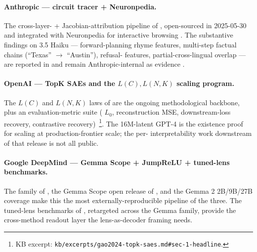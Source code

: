 \paragraph{Anthropic --- circuit tracer + Neuronpedia.}
The cross-layer- + Jacobian-attribution pipeline of
\citet{lindsey2025-circuit-tracing}, open-sourced in 2025-05-30 and
integrated with Neuronpedia for interactive  browsing
. The substantive findings on 
3.5 Haiku --- forward-planning rhyme features, multi-step factual
chains (``Texas'' $\to$ ``Austin''), refusal- features,
partial-cross-lingual  overlap --- are reported in
\citet{lindsey2025-biology} and remain Anthropic-internal as evidence
.

\paragraph{OpenAI --- TopK SAEs and the $L(C), L(N, K)$ scaling
program.}
The $L(C)$ and $L(N, K)$ laws of \citet{gao2024-topk-saes} are the
ongoing methodological backbone, plus an evaluation-metric suite (
$L_0$, reconstruction MSE, downstream-loss recovery, contrastive 
recovery)~\citep[\S 1 contributions]{gao2024-topk-saes}\footnote{KB
excerpt: \texttt{kb/excerpts/gao2024-topk-saes.md\#sec-1-headline}.}.
The 16M-latent GPT-4  is the existence proof for  scaling at
production-frontier scale; the per- interpretability work
downstream of that release is not all public.

\paragraph{Google DeepMind --- Gemma Scope + JumpReLU + tuned-lens
benchmarks.}
The  family of \citet{rajamanoharan2024-jumprelu}, the
Gemma Scope open release of \citet{gemma-scope-2024}, and the Gemma 2
2B/9B/27B coverage make this the most externally-reproducible pipeline
of the three. The tuned-lens benchmarks of
\citet{belrose2023-tuned-lens}, retargeted across the Gemma family,
provide the cross-method readout layer the lens-as-decoder framing
needs.

